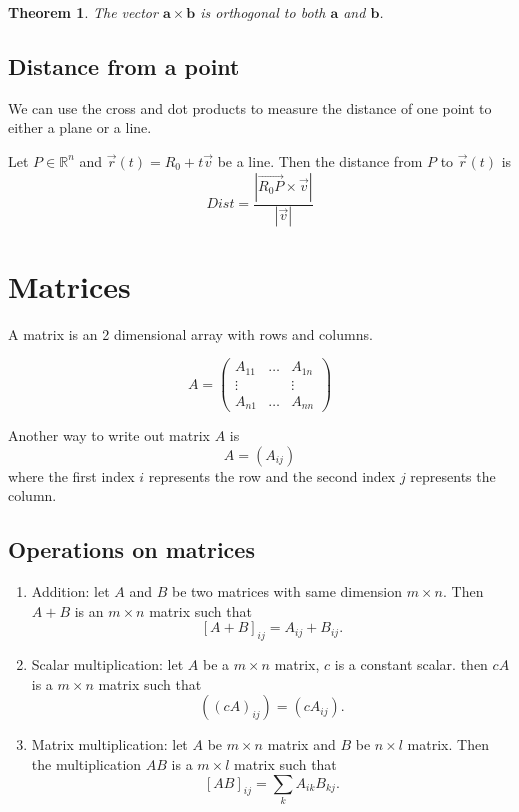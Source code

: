 \documentclass[
]{book}
\newtheorem{theorem}{Theorem}[chapter]
\theoremstyle{definition}
\theoremstyle{definition}
\theoremstyle{definition}
\theoremstyle{definition}
\theoremstyle{remark}
\begin{document}
\begin{theorem}
The vector \(\mathbf{a}\times \mathbf{b}\) is orthogonal to both \(\mathbf{a}\) and \(\mathbf{b}\).
\end{theorem}

\subsection{Distance from a point}\label{distance-from-a-point}

We can use the cross and dot products to measure the distance of one point to either a
plane or a line.

Let \(P \in \mathbb{R}^n\) and \(\vec{r}(t) = R_0 + t \vec{v}\) be a line.
Then the distance from \(P\) to \(\vec{r}(t)\) is
\[ Dist = \frac{| \vec{R_0 P} \times \vec{v}|}{| \vec{v} |}\]

\section{Matrices}\label{matrices}

A matrix is an 2 dimensional array with rows and columns.

\[ A = \begin{pmatrix} A_{11} & \dots & A_{1n}\\ \vdots & & \vdots \\ A_{n1} & \dots & A_{nn}  \end{pmatrix}\]

Another way to write out matrix \(A\) is
\[ A = (A_{ij})\]
where the first index \(i\) represents the row and the second index \(j\) represents the column.

\subsection{Operations on matrices}\label{operations-on-matrices}

\begin{enumerate}
\def\labelenumi{\arabic{enumi}.}
\item
  Addition: let \(A\) and \(B\) be two matrices with same dimension \(m\times n\).
  Then \(A + B\) is an \(m\times n\) matrix such that
  \[[A + B]_{ij} = A_{ij} + B_{ij}.\]
\item
  Scalar multiplication: let \(A\) be a \(m\times n\) matrix,
  \(c\) is a constant scalar.
  then \(cA\) is a \(m\times n\) matrix such that
  \[((cA)_{ij}) = (cA_{ij}).\]
\item
  Matrix multiplication: let \(A\) be \(m\times n\) matrix and \(B\) be \(n\times l\) matrix.
  Then the multiplication \(AB\) is a \(m\times l\) matrix such that
  \[ [AB]_{ij}  =  \sum_{k} A_{ik} B_{kj} .\]
\end{enumerate}
\end{document}
